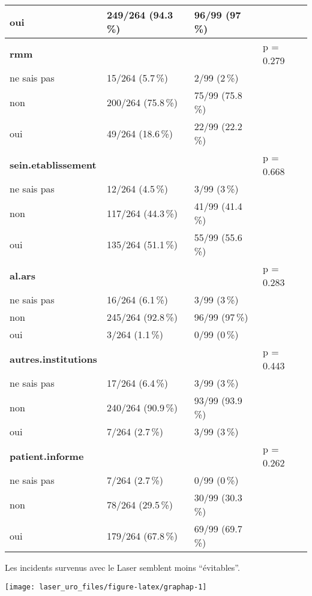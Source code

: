 \documentclass[a4paper,fontsize=10pt,french]{scrartcl}
\begin{document}
\begin{table}
\begin{tabular}[t]{l|l|l|l}
oui & 249/264 (94.3\,\%) & 96/99 (97\,\%) & \\
\midrule
\textbf{rmm} &  &  & p = 0.279\\
 
ne sais pas & 15/264 (5.7\,\%) & 2/99 (2\,\%) & \\
 
non & 200/264 (75.8\,\%) & 75/99 (75.8\,\%) & \\
 
oui & 49/264 (18.6\,\%) & 22/99 (22.2\,\%) & \\
\midrule
\textbf{sein.etablissement} &  &  & p = 0.668\\
 
ne sais pas & 12/264 (4.5\,\%) & 3/99 (3\,\%) & \\
 
non & 117/264 (44.3\,\%) & 41/99 (41.4\,\%) & \\
 
oui & 135/264 (51.1\,\%) & 55/99 (55.6\,\%) & \\
\midrule
\textbf{al.ars} &  &  & p = 0.283\\
 
ne sais pas & 16/264 (6.1\,\%) & 3/99 (3\,\%) & \\
 
non & 245/264 (92.8\,\%) & 96/99 (97\,\%) & \\
 
oui & 3/264 (1.1\,\%) & 0/99 (0\,\%) & \\
\midrule
\textbf{autres.institutions} &  &  & p = 0.443\\
ne sais pas & 17/264 (6.4\,\%) & 3/99 (3\,\%) & \\
non & 240/264 (90.9\,\%) & 93/99 (93.9\,\%) & \\
oui & 7/264 (2.7\,\%) & 3/99 (3\,\%) & \\
\midrule
\textbf{patient.informe} &  &  & p = 0.262\\
ne sais pas & 7/264 (2.7\,\%) & 0/99 (0\,\%) & \\
non & 78/264 (29.5\,\%) & 30/99 (30.3\,\%) & \\
oui & 179/264 (67.8\,\%) & 69/99 (69.7\,\%) & \\
  \bottomrule
\end{tabular}
\end{table}

Les incidents survenus avec le Laser semblent moins ``évitables''.

\texttt{[image: laser\_uro\_files/figure-latex/graphap-1]}
\end{document}
